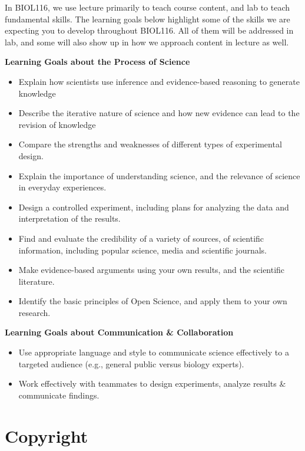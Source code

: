 \documentclass[
]{book}
\providecommand{\tightlist}{%
  \setlength{\itemsep}{0pt}\setlength{\parskip}{0pt}}
\begin{document}
In BIOL116, we use lecture primarily to teach course content, and lab to teach fundamental skills. The learning goals below highlight some of the skills we are expecting you to develop throughout BIOL116. All of them will be addressed in lab, and some will also show up in how we approach content in lecture as well.

\textbf{Learning Goals about the Process of Science}

\begin{itemize}
\tightlist
\item
  Explain how scientists use inference and evidence-based reasoning to generate knowledge
\item
  Describe the iterative nature of science and how new evidence can lead to the revision of knowledge
\item
  Compare the strengths and weaknesses of different types of experimental design.
\item
  Explain the importance of understanding science, and the relevance of science in everyday experiences.
\item
  Design a controlled experiment, including plans for analyzing the data and interpretation of the results.
\item
  Find and evaluate the credibility of a variety of sources, of scientific information, including popular science, media and scientific journals.
\item
  Make evidence-based arguments using your own results, and the scientific literature.
\item
  Identify the basic principles of Open Science, and apply them to your own research.
\end{itemize}

\textbf{Learning Goals about Communication \& Collaboration}

\begin{itemize}
\tightlist
\item
  Use appropriate language and style to communicate science effectively to a targeted audience (e.g., general public versus biology experts).
\item
  Work effectively with teammates to design experiments, analyze results \& communicate findings.
\end{itemize}

\hypertarget{copyright}{%
\section*{Copyright}\label{copyright}}
\end{document}
